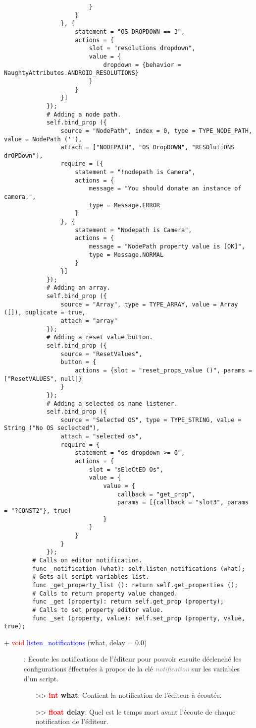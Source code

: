 \documentclass[a4paper, 11pt]{article}
\begin{document}
\begin{lstlisting}
						}
					}
				}, {
					statement = "OS DROPDOWN == 3",
					actions = {
						slot = "resolutions dropdown",
						value = {
							dropdown = {behavior = NaughtyAttributes.ANDROID_RESOLUTIONS}
						}
					}
				}]
			});
			# Adding a node path.
			self.bind_prop ({
				source = "NodePath", index = 0, type = TYPE_NODE_PATH, value = NodePath (''),
				attach = ["NODEPATH", "OS DropDOWN", "RESOlutiONS drOPDown"],
				require = [{
					statement = "!nodepath is Camera",
					actions = {
						message = "You should donate an instance of camera.",
						type = Message.ERROR
					}
				}, {
					statement = "Nodepath is Camera",
					actions = {
						message = "NodePath property value is [OK]",
						type = Message.NORMAL
					}
				}]
			});
			# Adding an array.
			self.bind_prop ({
				source = "Array", type = TYPE_ARRAY, value = Array ([]), duplicate = true,
				attach = "array"
			});
			# Adding a reset value button.
			self.bind_prop ({
				source = "ResetValues",
				button = {
					actions = {slot = "reset_props_value ()", params = ["ResetVALUES", null]}
				}
			});
			# Adding a selected os name listener.
			self.bind_prop ({
				source = "Selected OS", type = TYPE_STRING, value = String ("No OS seclected"),
				attach = "selected os",
				require = {
					statement = "os dropdown >= 0",
					actions = {
						slot = "sEleCtED Os",
						value = {
							value = {
								callback = "get_prop",
								params = [{callback = "slot3", params = "?CONST2"}, true]
							}
						}
					}
				}
			});
		# Calls on editor notification.
		func _notification (what): self.listen_notifications (what);
		# Gets all script variables list.
		func _get_property_list (): return self.get_properties ();
		# Calls to return property value changed.
		func _get (property): return self.get_prop (property);
		# Calls to set property editor value.
		func _set (property, value): self.set_prop (property, value, true);
	\end{lstlisting}
	\begin{description}
		\item [+ \textcolor{red}{void} \textcolor{blue}{\hypertarget{listennotifications}
		{listen\_notifications}} (what, delay = 0.0)]: Ecoute les notifications de l'éditeur pour pouvoir 
		ensuite déclenché les configurations éffectuées à propos de la clé \textit{\textcolor{gray}
		{notification}} sur les variables d'un script.
		\begin{itemize}
			\item[>> \textbf{\textcolor{red}{int} what}:] Contient la notification de l'éditeur à écoutée.
			\item[>> \textbf{\textcolor{red}{float} delay}:] Quel est le temps mort avant l'écoute de chaque 
			notification de l'éditeur.\\
		\end{itemize}
	\end{description}
\end{document}
